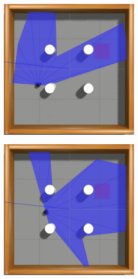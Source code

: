 \begin{figure}[H]
\begin{center}
\begin{subfigure}[b]{0.60\textwidth}
\begin{subfigure}[b]{0.24\textwidth}
            \includegraphics[width=\textwidth]{imagens/simulated_envs/sim_env2_sac/2.png}
        \end{subfigure}
        \hfill
        \begin{subfigure}[b]{0.24\textwidth}
            \includegraphics[width=\textwidth]{imagens/simulated_envs/sim_env2_sac/3.png}

\end{subfigure}
\end{subfigure}
\end{center}
\end{figure}
